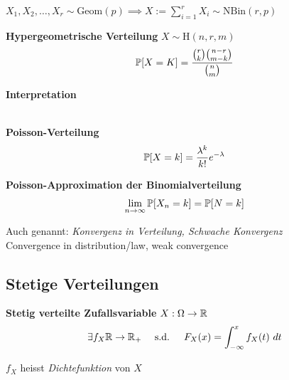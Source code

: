 \lemma $X_1,X_2,\ldots,X_r \sim \text{Geom}(p) \implies X := \sum_{i=1}^{r}X_i \sim \text{NBin}(r,p)$

\normalsize


\newpage

 \textbf{Hypergeometrische Verteilung} $X \sim \text{H}(n, r, m)$
$$
    \P[X = K] = \frac{\binom{r}{k}\binom{n-r}{m-k}}{\binom{n}{m}}
$$

\theorem \textbf{Interpretation}\\
\\

 \textbf{Poisson-Verteilung}\\
$$
    \P[X=k] = \frac{\lambda^k}{k!}e^{-\lambda}
$$

\theorem \textbf{Poisson-Approximation der Binomialverteilung}\\
$$
    \limn \P[X_n=k] = \P[N=k]
$$

\scriptsize

\remark Auch genannt: \textit{Konvergenz in Verteilung, Schwache Konvergenz}\\
\color{gray}
Convergence in distribution/law, weak convergence
\color{black}

\normalsize

\newpage

\subsection{Stetige Verteilungen}

 \textbf{Stetig verteilte Zufallsvariable} $X: \Omega \to \R$\\
$$
    \exists f_X \R \to \R_+ \quad\text{ s.d. }\quad F_X(x) = \int_{-\infty}^{x}f_X(t)\ dt
$$

{\scriptsize
    \remark $f_X$ heisst \textit{Dichtefunktion} von $X$
}

